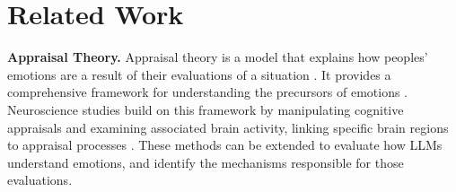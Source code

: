 \section{Related Work}
\textbf{Appraisal Theory.}
Appraisal theory is a model that explains how peoples' emotions are a result of their evaluations of a situation \cite{lazarus1991emotion}. It provides a comprehensive framework for understanding the precursors of emotions \cite{smith2011role}. Neuroscience studies build on this framework by manipulating cognitive appraisals and examining associated brain activity, linking specific brain regions to appraisal processes \cite{leitao2020computational, kragel2024can, brosch2013comment}. These methods can be extended to evaluate how LLMs understand emotions, and identify the mechanisms responsible for those evaluations. 




